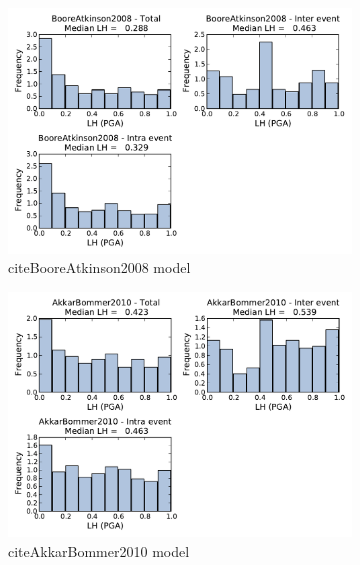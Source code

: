 \begin{figure}[htb]
  \centering
  \begin{subfigure}[b]{0.49\textwidth}
      \includegraphics[width=\textwidth]{./figures/residuals/BA2008_LH_PGA.pdf}
      \caption{citeBooreAtkinson2008 model}
      \label{fig:pga_lh_ba2008}
  \end{subfigure}
    \begin{subfigure}[b]{0.49\textwidth}
      \includegraphics[width=\textwidth]{./figures/residuals/AB2010_LH_PGA.pdf}
      \caption{citeAkkarBommer2010 model}
      \label{fig:pga_lh_ab2010}
  \end{subfigure}
    \begin{subfigure}[b]{0.49\textwidth}

\end{subfigure}
\end{figure}
